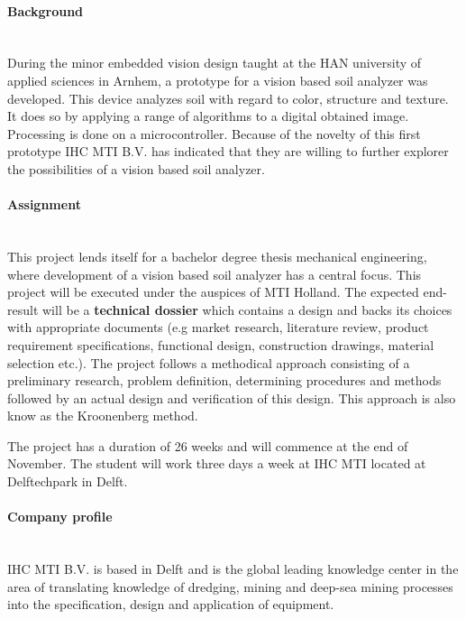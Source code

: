 \documentclass[a4paper,11pt]{../LatexDocStructures/MTItexMemo} %
\begin{document}
\maketitle %

\paragraph{Background}\mbox{} \\
During the minor embedded vision design taught at the HAN university of applied sciences in Arnhem, a prototype for a vision based soil analyzer was developed. This device analyzes soil with regard to color, structure and texture. It does so by applying a range of algorithms to a digital obtained image. Processing is done on a microcontroller. Because of the novelty of this first prototype IHC MTI B.V. has indicated that they are willing to further explorer the possibilities of a vision based soil analyzer.

\paragraph{Assignment}\mbox{} \\
This project lends itself for a bachelor degree thesis mechanical engineering, where development of a vision based soil analyzer has a central focus. This project will be executed under the auspices of MTI Holland. The expected end-result will be a \textbf{technical dossier} which contains a design and backs its choices with appropriate documents (e.g market research, literature review, product requirement specifications, functional design, construction drawings, material selection etc.). The project follows a methodical approach consisting of a preliminary research, problem definition, determining procedures and methods followed by an actual design and verification of this design. This approach is also know as the Kroonenberg method.

The project has a duration of 26 weeks and will commence at the end of November. The student will work three days a week at IHC MTI located at Delftechpark in Delft.

\paragraph{Company profile}\mbox{} \\
IHC MTI B.V. is based in Delft and is the global leading knowledge center in the area of translating knowledge of dredging, mining and deep-sea mining processes into the specification, design and application of equipment. 
\end{document}
